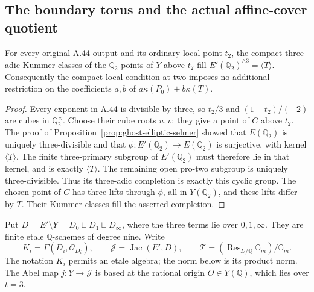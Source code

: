 \subsection{The boundary torus and the actual affine-cover quotient}
\label{sec:ghost-generalized-jacobian}

\begin{lemma}
\label{lem:ghost-elliptic-two-fibre}
For every original A.44 output and its ordinary local point
\(t_2\), the compact three-adic Kummer classes of the
\(\mathbb Q_2\)-points of \(Y\) above \(t_2\) fill
\(E'(\mathbb Q_2)^{\wedge3}=\langle T\rangle\).
Consequently the compact local condition at two imposes
no additional restriction on the coefficients \(a,b\)
of \(a\kappa(P_0)+b\kappa(T)\).
\end{lemma}
\begin{proof}
Every exponent in A.44 is divisible by three, so
\(t_2/3\) and \((1-t_2)/(-2)\) are cubes in
\(\mathbb Q_2^\times\). Choose their cube roots
\(u,v\); they give a point of \(C\) above \(t_2\).
The proof of Proposition~\ref{prop:ghost-elliptic-selmer}
showed that \(E(\mathbb Q_2)\) is uniquely
three-divisible and that
\(\phi:E'(\mathbb Q_2)\to E(\mathbb Q_2)\)
is surjective, with kernel \(\langle T\rangle\).
The finite three-primary subgroup of \(E'(\mathbb Q_2)\)
must therefore lie in that kernel, and is exactly
\(\langle T\rangle\). The remaining open pro-two
subgroup is uniquely three-divisible. Thus its
three-adic completion is exactly this cyclic group.
The chosen point of \(C\) has three lifts through
\(\phi\), all in \(Y(\mathbb Q_2)\), and these
lifts differ by \(T\). Their Kummer classes fill
the asserted completion.
\end{proof}

Put \(D=E'\setminus Y=D_0\sqcup D_1\sqcup D_\infty\),
where the three terms lie over \(0,1,\infty\).
They are finite etale \(\mathbb Q\)-schemes of
degree nine. Write
\[
 K_i=\Gamma(D_i,\mathcal O_{D_i}),\qquad
 \mathcal J=\operatorname{Jac}(E',D),\qquad
 \mathcal T=(\operatorname{Res}_{D/\mathbb Q}\mathbb G_m)
                         /\mathbb G_m.
                                                        \tag{25}
\]
The notation \(K_i\) permits an etale algebra; the
norm below is its product norm. The Abel map
\(j:Y\to\mathcal J\) is based at the rational
origin \(O\in Y(\mathbb Q)\), which lies over
\(t=3\).

